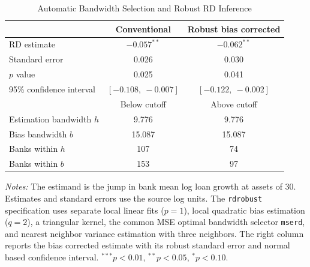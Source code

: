 \begin{table}[H]
\centering
\small
\caption{Automatic Bandwidth Selection and Robust RD Inference}
\label{tab:q2_robust}
\begin{tabular*}{\textwidth}{@{\extracolsep{\fill}}lcc}
\toprule
 & Conventional & Robust bias corrected \\
\midrule
RD estimate & $-0.057^{**}$ & $-0.062^{**}$ \\
Standard error & 0.026 & 0.030 \\
$p$ value & 0.025 & 0.041 \\
95\% confidence interval & $[-0.108,\ -0.007]$ & $[-0.122,\ -0.002]$ \\
\midrule
 & Below cutoff & Above cutoff \\
Estimation bandwidth $h$ & 9.776 & 9.776 \\
Bias bandwidth $b$ & 15.087 & 15.087 \\
Banks within $h$ & 107 & 74 \\
Banks within $b$ & 153 & 97 \\
\bottomrule
\end{tabular*}
\begin{minipage}{\textwidth}\footnotesize
\textit{Notes:} The estimand is the jump in bank mean log loan growth at assets of 30. Estimates and standard errors use the source log units. The \texttt{rdrobust} specification uses separate local linear fits ($p=1$), local quadratic bias estimation ($q=2$), a triangular kernel, the common MSE optimal bandwidth selector \texttt{mserd}, and nearest neighbor variance estimation with three neighbors. The right column reports the bias corrected estimate with its robust standard error and normal based confidence interval. $^{***}p<0.01$, $^{**}p<0.05$, $^{*}p<0.10$.
\end{minipage}
\end{table}

